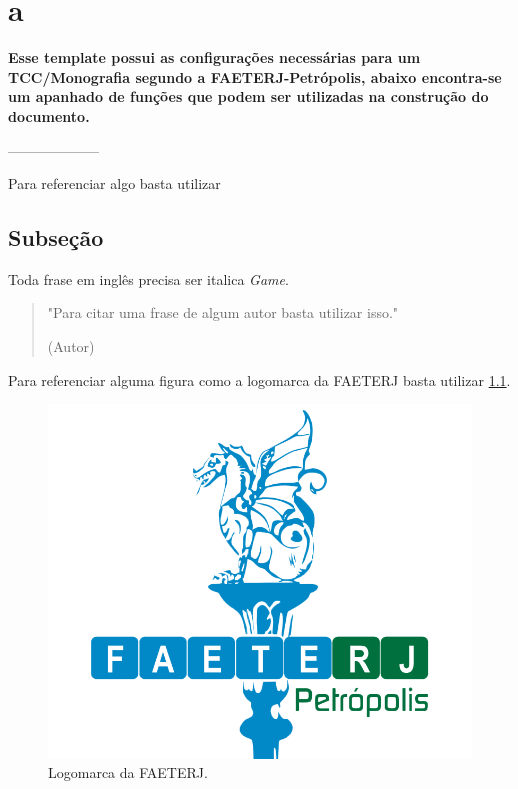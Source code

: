 \chapter{a} %
\textbf{Esse template possui as configurações necessárias para um TCC/Monografia segundo a FAETERJ-Petrópolis, abaixo encontra-se um apanhado de funções que podem ser utilizadas na construção do documento.}


--------------------


Para referenciar algo basta utilizar \cite{unesco} %

\section{Subseção} %
Toda frase em inglês precisa ser italica \textit{Game}.



\begin{quote}
\small "Para citar uma frase de algum autor basta utilizar isso." 

(Autor)
\end{quote}



Para referenciar alguma figura como a logomarca da FAETERJ basta utilizar \ref{fig:faeterj}. %

\begin{figure}[!htb]
     \centering
     \includegraphics[scale=0.24]{imagens/faeterj.png}
     \caption{\small Logomarca da FAETERJ.}
     \label{fig:faeterj}
\end{figure}



